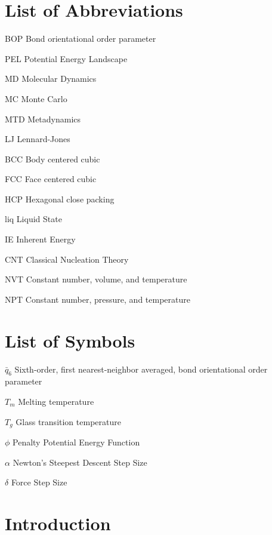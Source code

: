 \documentclass[edeposit,fullpage, centerchapter]{uiucthesis2009}
\begin{document}
\chapter{List of Abbreviations}
\begin{symbollist*}
\item[BOP] Bond orientational order parameter
\item[PEL] Potential Energy Landscape
\item[MD] Molecular Dynamics
\item[MC] Monte Carlo
\item[MTD] Metadynamics
\item[LJ] Lennard-Jones 
\item[BCC] Body centered cubic
\item[FCC] Face centered cubic
\item[HCP] Hexagonal close packing
\item[liq] Liquid State
\item[IE] Inherent Energy
\item[CNT] Classical Nucleation Theory
\item[NVT] Constant number, volume, and temperature 
\item[NPT] Constant number, pressure, and temperature
\end{symbollist*}

\chapter{List of Symbols}

\begin{symbollist}[0.7in]
\item[$\bar{q}_6$] Sixth-order, first nearest-neighbor averaged, bond orientational order parameter 
\item[$T_m$] Melting temperature
\item[$T_g$] Glass transition temperature
\item[$\phi$] Penalty Potential Energy Function
\item[$\alpha$] Newton's Steepest Descent Step Size
\item[$\delta$] Force Step Size
\end{symbollist}

\mainmatter
\chapter{Introduction}

\end{document}
